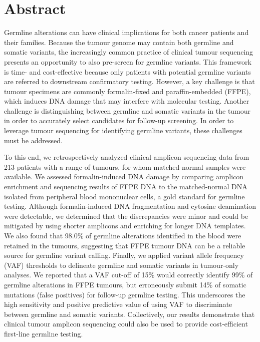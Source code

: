 
\chapter{Abstract}

Germline alterations can have clinical implications for both cancer patients and their families. Because the tumour genome may contain both germline and somatic variants, the increasingly common practice of clinical tumour sequencing presents an opportunity to also pre-screen for germline variants. This framework is time- and cost-effective because only patients with potential germline variants are referred to downstream confirmatory testing. However, a key challenge is that tumour specimens are commonly formalin-fixed and paraffin-embedded (FFPE), which induces DNA damage that may interfere with molecular testing. Another challenge is distinguishing between germline and somatic variants in the tumour in order to accurately select candidates for follow-up screening. In order to leverage tumour sequencing for identifying germline variants, these challenges must be addressed.

To this end, we retrospectively analyzed clinical amplicon sequencing data from 213 patients with a range of tumours, for whom matched-normal samples were available. We assessed formalin-induced DNA damage by comparing amplicon enrichment and sequencing results of FFPE DNA to the matched-normal DNA isolated from peripheral blood mononuclear cells, a gold standard for germline testing. Although formalin-induced DNA fragmentation and cytosine deamination were detectable, we determined that the discrepancies were minor and could be mitigated by using shorter amplicons and enriching for longer DNA templates. We also found that 98.0\% of germline alterations identified in the blood were retained in the tumours, suggesting that FFPE tumour DNA can be a reliable source for germline variant calling. Finally, we applied variant allele frequency (VAF) thresholds to delineate germline and somatic variants in tumour-only analyses. We reported that a VAF cut-off of 15\% would correctly identify 99\% of germline alterations in FFPE tumours, but erroneously submit 14\% of somatic mutations (false positives) for follow-up germline testing. This underscores the high sensitivity and positive predictive value of using VAF to discriminate between germline and somatic variants. Collectively, our results demonstrate that clinical tumour amplicon sequencing could also be used to provide cost-efficient first-line germline testing.



